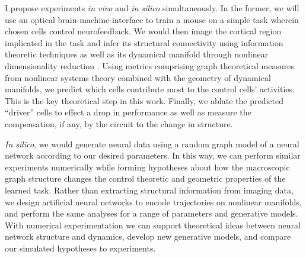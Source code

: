 \documentclass[a4paper,12pt]{article}
\begin{document}
I propose experiments \textit{in vivo} and \textit{in silico} simultaneously. In the former, we will use an optical brain-machine-interface to train a mouse on a simple task wherein chosen cells control neurofeedback. We would then image the cortical region implicated in the task and infer its structural connectivity using information theoretic techniques as well as its dynamical manifold through nonlinear dimensionality reduction \cite{Orlandi2014, Gashler2008}. Using metrics comprising graph theoretical measures from nonlinear systems theory combined with the geometry of dynamical manifolds, we predict which cells contribute most to the control cells' activities. This is the key theoretical step in this work. Finally, we ablate the predicted ``driver'' cells to effect a drop in performance as well as measure the compensation, if any, by the circuit to the change in structure. 

\textit{In silico}, we would generate neural data using a random graph model of a neural network according to our desired parameters. In this way, we can perform similar experiments numerically while forming hypotheses about how the macroscopic graph structure changes the control theoretic and geometric properties of the learned task. Rather than extracting structural information from imaging data, we design artificial neural networks to encode trajectories on nonlinear manifolds, and perform the same analyses for a range of parameters and generative models. With numerical experimentation we can support theoretical ideas between neural network structure and dynamics, develop new generative models, and compare our simulated hypotheses to experiments.   

\newpage


\end{document}
